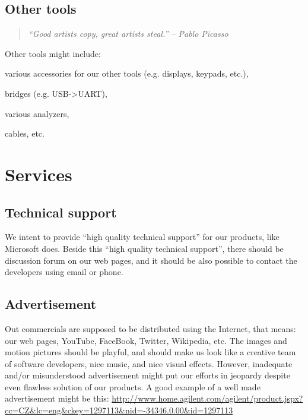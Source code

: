 \documentclass[a4paper,twoside,15pt]{book}
\begin{document}
		\subsection{Other tools}
			\begin{quote}
				\textit{``Good artists copy, great artists steal.'' -- Pablo Picasso}
			\end{quote}
			Other tools might include:
			\begin{dinglist}{73}
				\setlength{\itemsep}{-3pt}
				\item various accessories for our other tools (e.g. displays, keypads, etc.),
				\item bridges (e.g. USB->UART),
				\item various analyzers,
				\item cables, etc.
			\end{dinglist}

	\section{Services}
		\subsection{Technical support}
			We intent to provide ``high quality technical support'' for our products, like Microsoft does. Beside this ``high quality technical support'', there should be discussion forum on our web pages, and it should be also possible to contact the developers using email or phone.

		\subsection{Advertisement}
			Out commercials are supposed to be distributed using the Internet, that means: our web pages, YouTube, FaceBook, Twitter, Wikipedia, etc. The images and motion pictures should be playful, and should make us look like a creative team of software developers, nice music, and nice visual effects. However, inadequate and/or misunderstood advertisement might put our efforts in jeopardy despite even flawless solution of our products. A good example of a well made advertisement might be this: \url{http://www.home.agilent.com/agilent/product.jspx?cc=CZ&lc=eng&ckey=1297113&nid=-34346.0.00&id=1297113}
\end{document}
